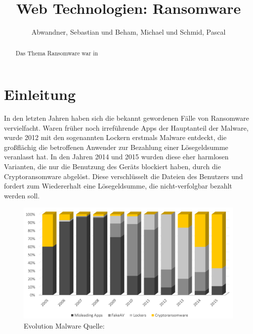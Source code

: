 \documentclass[runningheads,a4paper]{llncs}
\begin{document}


\title{Web Technologien: Ransomware}
{}

\author{Abwandner, Sebastian und Beham, Michael und Schmid, Pascal}


\maketitle

\begin{abstract}
Das Thema Ransomware war in
\end{abstract}

\section{Einleitung}\label{sec:intro}
In den letzten Jahren haben sich die bekannt gewordenen Fälle von Ransomware vervielfacht. Waren früher noch irreführende Apps der Hauptanteil der Malware, wurde 2012 mit den sogenannten Lockern erstmals Malware entdeckt, die großflächig die betroffenen Anwender zur Bezahlung einer Lösegeldsumme veranlasst hat. In den Jahren 2014 und 2015 wurden diese eher harmlosen Varianten, die nur die Benutzung des Geräts blockiert haben, durch die Cryptoransomware abgelöst. Diese verschlüsselt die Dateien des Benutzers und fordert zum Wiedererhalt eine Lösegeldsumme, die nicht-verfolgbar bezahlt werden soll.

	\begin{figure}[h!]
		\centering
		\includegraphics[width=\linewidth]{img/ransom-evolution.png}
		\caption{Evolution Malware Quelle: \cite{aids:evolution}}
		\label{fig:ransom-evo}
	\end{figure}
\end{document}
